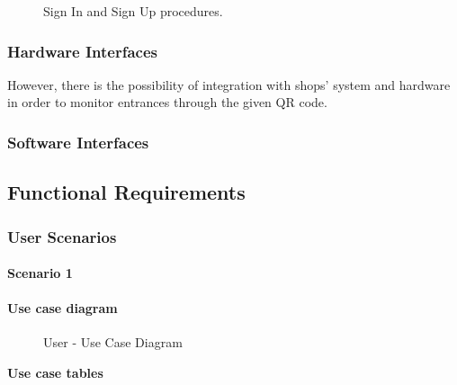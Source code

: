 \begin{figure}[H]
    \begin{center}
        \caption{Sign In and Sign Up procedures.}
        \label{mock_sign_in_up}
    \end{center}
\end{figure}


\subsubsection{Hardware Interfaces}

However, there is the possibility of integration with shops' system and hardware in order to monitor entrances through the given QR code.
\subsubsection{Software Interfaces}

\subsection{Functional Requirements}
\subsubsection{User Scenarios}
\paragraph{Scenario 1}



\paragraph{Use case diagram}
\begin{figure}[H]
    \begin{center}
        \caption{User - Use Case Diagram}
    \end{center}
\end{figure}



\textbf{Use case tables}

